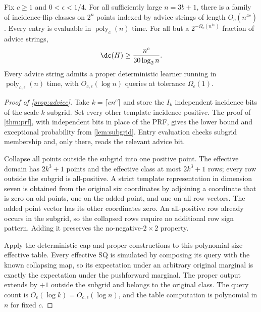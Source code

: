 \begin{proposition}\label{prop:advice}
Fix $c\ge1$ and $0<\epsilon<1/4$. For all sufficiently large $n=3b+1$, there is a family of incidence-flip classes on $2^n$ points indexed by advice strings of length $O_c(n^{4c})$. Every entry is evaluable in $\operatorname{poly}_c(n)$ time. For all but a $2^{-\Omega_c(n^{4c})}$ fraction of advice strings,
\[
 \dc(H)\ge\frac{n^c}{30\log_2 n}.
\]
Every advice string admits a proper deterministic learner running in $\operatorname{poly}_{c,\epsilon}(n)$ time, with $O_{c,\epsilon}(\log n)$ queries at tolerance $\Omega_\epsilon(1)$.
\end{proposition}

\begin{proof}[Proof of \cref{prop:advice}]

Take $k=\lceil cn^c\rceil$ and store the $I_k$ independent incidence bits of the scale-$k$ subgrid. Set every other template incidence positive. The proof of \cref{thm:prf}, with independent bits in place of the PRF, gives the lower bound and exceptional probability from \cref{lem:subgrid}. Entry evaluation checks subgrid membership and, only there, reads the relevant advice bit.

Collapse all points outside the subgrid into one positive point. The effective domain has $2k^3+1$ points and the effective class at most $2k^3+1$ rows; every row outside the subgrid is all-positive. A strict template representation in dimension seven is obtained from the original six coordinates by adjoining a coordinate that is zero on old points, one on the added point, and one on all row vectors. The added point vector has its other coordinates zero. An all-positive row already occurs in the subgrid, so the collapsed rows require no additional row sign pattern. Adding it preserves the no-negative-$2\times2$ property.

Apply the deterministic cap and proper constructions to this polynomial-size effective table. Every effective SQ is simulated by composing its query with the known collapsing map, so its expectation under an arbitrary original marginal is exactly the expectation under the pushforward marginal. The proper output extends by $+1$ outside the subgrid and belongs to the original class. The query count is $O_\epsilon(\log k)=O_{c,\epsilon}(\log n)$, and the table computation is polynomial in $n$ for fixed $c$.

\end{proof}

